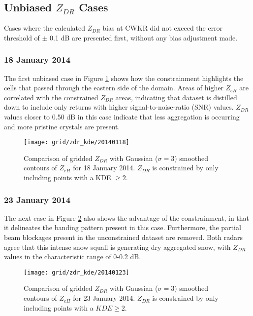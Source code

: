 \subsection{Unbiased $Z_{DR}$ Cases}
Cases where the calculated $Z_{DR}$ bias at CWKR did not exceed the error threshold of $\pm$ 0.1 dB are presented first, without any bias adjustment made.
\subsubsection{18 January 2014}
The first unbiased case in Figure \ref{fig:grid_zdr_kde_20140118} shows how the constrainment highlights the cells that passed through the eastern side of
the domain. Areas of higher $Z_{eH}$  are correlated with the constrained $Z_{DR}$ areas, indicating that dataset is distilled down to include only returns
with higher signal-to-noise-ratio (SNR) values. $Z_{DR}$ values closer to 0.50 dB in this case indicate that less aggregation is occurring and more pristine
crystals are present.
\begin{figure}[H]
\texttt{[image: grid/zdr\_kde/20140118]}
\caption{Comparison of gridded $Z_{DR}$ with Gaussian ($\sigma=3$) smoothed contours of $Z_{eH}$ for 18 January 2014. $Z_{DR}$ is constrained by only including points
with a KDE $\geq 2$.}
\label{fig:grid_zdr_kde_20140118}
\end{figure}
\subsubsection{23 January 2014}
The next case in Figure \ref{fig:grid_zdr_kde_20140123} also shows the advantage of the constrainment, in that it delineates the banding pattern present in this case. Furthermore, the partial beam blockages present in the unconstrained dataset are removed. Both radars agree that this intense snow
squall is generating dry aggregated snow, with $Z_{DR}$ values in the characteristic range of 0-0.2 dB.
\begin{figure}[H]
\texttt{[image: grid/zdr\_kde/20140123]}
\caption{Comparison of gridded $Z_{DR}$ with Gaussian ($\sigma=3$) smoothed contours of $Z_{eH}$ for 23 January 2014. $Z_{DR}$ is constrained by only including points with a
$KDE \geq 2$.} 
\label{fig:grid_zdr_kde_20140123}
\end{figure}
